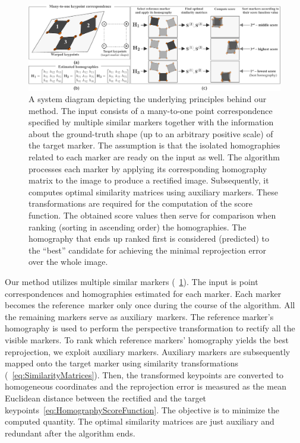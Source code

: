 \begin{figure}[t]
    \centerline{\includegraphics[width=\linewidth]{figures/homography/system_diagram.pdf}}
    \caption[Homography ranking system diagram]{A system diagram depicting the underlying principles behind our method.  The input consists of a many-to-one point correspondence specified by multiple similar markers together with the information about the ground-truth shape (up to an arbitrary positive scale) of the target marker.  The assumption is that the isolated homographies related to each marker are ready on the input as well.  The algorithm processes each marker by applying its corresponding homography matrix to the image to produce a rectified image. Subsequently, it computes optimal similarity matrices using auxiliary markers. These transformations are required for the computation of the score function. The obtained score values then serve for comparison when ranking (sorting in ascending order) the homographies. The homography that ends up ranked first is considered (predicted) to the ``best'' candidate for achieving the minimal reprojection error over the whole image.}
    \label{fig:HomographySystemDiagram}
\end{figure}

Our method utilizes multiple similar markers (\figtext{}~\ref{fig:HomographySystemDiagram}). The input is point correspondences and homographies estimated for each marker. Each marker becomes the \mbox{reference marker} only once during the course of the algorithm. All the remaining markers serve as \mbox{auxiliary markers}. The reference marker's homography is used to perform the perspective transformation to rectify all the visible markers. To rank which reference markers' homography yields the best reprojection, we exploit auxiliary markers. Auxiliary markers are subsequently mapped onto the target marker using similarity transformations (\eqtext{}~\ref{eq:SimilarityMatrices}). Then, the transformed keypoints are converted to homogeneous coordinates and the reprojection error is measured as the mean Euclidean distance between the rectified and the target keypoints~\ref{eq:HomographyScoreFunction}. The objective is to minimize the computed quantity. The optimal similarity matrices are just auxiliary and redundant after the algorithm ends.

